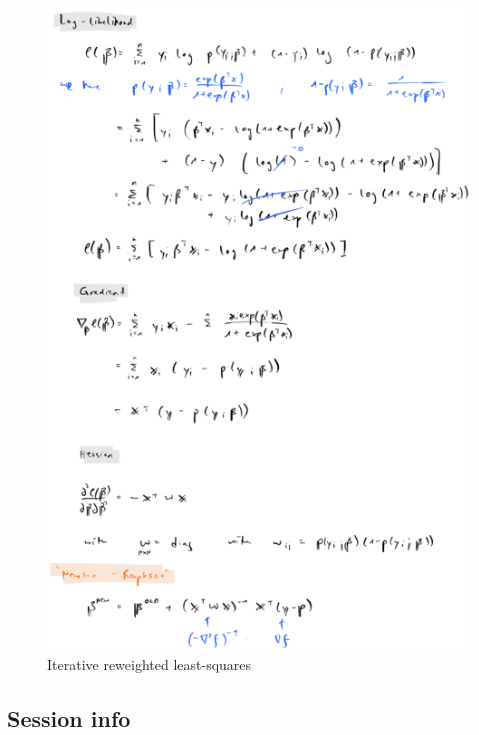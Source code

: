 \documentclass[
]{book}
\begin{document}
\begin{figure}
\centering
\includegraphics{www/irls.png}
\caption{Iterative reweighted least-squares}
\end{figure}

\hypertarget{app-session}{%
\subsection*{Session info}\label{app-session}}
\end{document}
